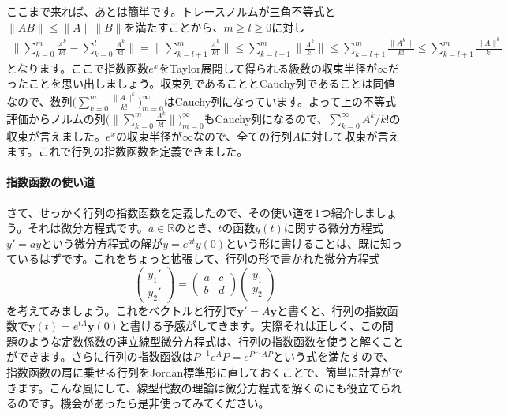 ここまで来れば、あとは簡単です。トレースノルムが三角不等式と$\|AB\| \leq \|A\| \|B\|$を満たすことから、$m \geq l \geq 0$に対し
\begin{align*}
\Biggl\|\sum_{k = 0}^m \frac{A^k}{k!} - \sum_{k = 0}^l \frac{A^k}{k!} \Biggr\|
= \Biggl\|\sum_{k = l + 1}^m \frac{A^k}{k!} \Biggr\|
\leq \sum_{k = l + 1}^m \biggl\|\frac{A^k}{k!} \biggr\|
\leq \sum_{k = l + 1}^m \frac{\|A^k\|}{k!}
\leq \sum_{k = l + 1}^m \frac{\|A\|^k}{k!}
\end{align*}
となります。ここで指数函数$e^x$をTaylor展開して得られる級数の収束半径が$\infty$だったことを思い出しましょう。収束列であることとCauchy列であることは同値なので、数列$\bigl(\sum_{k = 0}^m \frac{\|A\|^k}{k!}\bigr)_{m = 0}^{\infty}$はCauchy列になっています。よって上の不等式評価からノルムの列$\bigl(\|\sum_{k = 0}^m \frac{A^k}{k!}\|\bigr)_{m = 0}^{\infty}$もCauchy列になるので、$\sum_{k = 0}^{\infty} A^k / k!$の収束が言えました。$e^x$の収束半径が$\infty$なので、全ての行列$A$に対して収束が言えます。これで行列の指数函数を定義できました。

\paragraph{指数函数の使い道}

さて、せっかく行列の指数函数を定義したので、その使い道を$1$つ紹介しましょう。それは微分方程式です。$a \in \mathbb{R}$のとき、$t$の函数$y(t)$に関する微分方程式$y' = ay$という微分方程式の解が$y = e^{at} y(0)$という形に書けることは、既に知っているはずです。これをちょっと拡張して、行列の形で書かれた微分方程式
\[
\begin{pmatrix}
y_1' \\
y_2'
\end{pmatrix}
=
\begin{pmatrix}
a & c \\
b & d
\end{pmatrix}
\begin{pmatrix}
y_1 \\
y_2
\end{pmatrix}
\]
を考えてみましょう。これをベクトルと行列で$\bm{y}' = A \bm{y}$と書くと、行列の指数函数で$\bm{y}(t) = e^{tA} \bm{y}(0)$と書ける予感がしてきます。実際それは正しく、この問題のような定数係数の連立線型微分方程式は、行列の指数函数を使うと解くことができます。さらに行列の指数函数は$P^{-1} e^{A} P = e^{P^{-1} A P}$という式を満たすので、指数函数の肩に乗せる行列をJordan標準形に直しておくことで、簡単に計算ができます。こんな風にして、線型代数の理論は微分方程式を解くのにも役立てられるのです。機会があったら是非使ってみてください。

